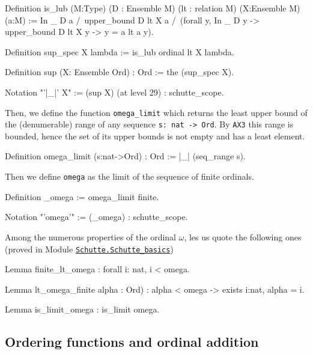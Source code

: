 {\begin{Coqsrc}
Definition is_lub (M:Type)
                  (D : Ensemble M)
                  (lt : relation M)
                  (X:Ensemble M)
                  (a:M) :=
   In _ D a  /\ upper_bound  D lt X a  /\
   (forall y, In _ D y -> upper_bound  D lt X y  -> 
                  y = a \/ lt a y).
\end{Coqsrc}


\begin{Coqsrc}
Definition sup_spec X lambda := is_lub ordinal lt X lambda.

Definition sup (X: Ensemble Ord) : Ord  := the  (sup_spec X).

Notation "'|_|' X" := (sup X) (at level 29) : schutte_scope.
\end{Coqsrc}



Then, we define the function \texttt{omega\_limit} which returns the least upper bound 
of the  (denumerable) range of any sequence \texttt{s: nat -> Ord}. 
By \texttt{AX3} this range is bounded, hence the set of its upper bounds is not empty and has a least element.


\begin{Coqsrc}
Definition omega_limit (s:nat->Ord) : Ord 
  := |_| (seq_range s).
\end{Coqsrc}

Then we define \texttt{omega} as the limit of the sequence of finite ordinals.


\label{sect:notation-omega}
\begin{Coqsrc}
Definition _omega := omega_limit finite.

Notation "'omega'" := (_omega) : schutte_scope.
\end{Coqsrc}



Among the numerous properties of the ordinal $\omega$, les us quote the following ones
(proved in Module 
\href{../theories/html/hydras.Schutte.Schutte_basics.html\#finite_lt_omega}{\texttt{Schutte.Schutte\_basics}})

\begin{Coqsrc}
Lemma finite_lt_omega : forall i: nat,  i < omega.

Lemma lt_omega_finite alpha : Ord) : 
  alpha < omega ->  exists i:nat, alpha =  i.

Lemma is_limit_omega : is_limit omega.
\end{Coqsrc}


\subsection{Ordering functions and ordinal addition}

}
